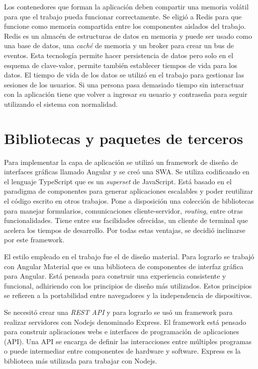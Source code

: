 Los contenedores que forman la aplicación deben compartir una memoria volátil para que el trabajo pueda funcionar correctamente.
Se eligió a Redis para que funcione como memoria compartida entre los componentes aislados del trabajo.
Redis es un almacén de estructuras de datos en memoria y puede ser usado como una base de datos, una \emph{caché} de memoria y un broker para crear un bus de eventos.
Esta tecnología permite hacer persistencia de datos pero solo en el esquema de clave-valor, permite también establecer tiempos de vida para los datos.
El tiempo de vida de los datos se utilizó en el trabajo para gestionar las sesiones de los usuarios.
Si una persona pasa demasiado tiempo sin interactuar con la aplicación tiene que volver a ingresar su usuario y contraseña para seguir utilizando el sistema con normalidad.	
	
\section{Bibliotecas y paquetes de terceros}

Para implementar la capa de aplicación se utilizó un framework de diseño de interfaces gráficas llamado Angular y se creó una SWA.
Se utiliza codificando en el lenguaje TypeScript que es un \emph{superset} de JavaScript.
Está basado en el paradigma de componentes para generar aplicaciones escalables y poder reutilizar el código escrito en otros trabajos.
Pone a disposición una colección de bibliotecas para manejar formularios, comunicaciones cliente-servidor, \emph{routing}, entre otras funcionalidades.
Tiene entre sus facilidades ofrecidas, un cliente de terminal que acelera los tiempos de desarrollo.
Por todas estas ventajas, se decidió inclinarse por este framework.

El estilo empleado en el trabajo fue el de diseño material.
Para lograrlo se trabajó con Angular Material que es una biblioteca de componentes de interfaz gráfica para Angular.
Está pensada para construir una experiencia consistente y funcional, adhiriendo con los principios de diseño más utilizados.
Estos principios se refieren a la portabilidad entre navegadores y la independencia de dispositivos.

Se necesitó crear una \emph{REST API} y para lograrlo se usó un framework para realizar servidores con Nodejs denominado Express.
El framework está pensado para construir aplicaciones webs e interfaces de programación de aplicaciones (API).
Una API se encarga de definir las interacciones entre múltiples programas o puede intermediar entre componentes de hardware y software.
Express es la biblioteca más utilizada para trabajar con Nodejs. \citep{WEBSITE:Express}

